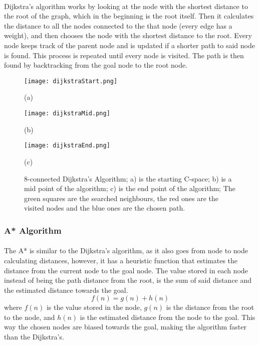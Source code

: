 \paragraph{}Dijkstra’s algorithm works by looking at the node with the shortest distance to the root of the graph, which
in the beginning is the root itself. Then it calculates the distance to all the nodes connected to the that node (every edge
 has a weight), and then chooses the node with the shortest distance to the root. Every node keeps track of the 
parent node and is updated if a shorter path to said node is found. This process is repeated until
every node is visited. The path is then found by backtracking from the goal node to the root node. 
\begin{figure}[htbp]
    \centering
    \begin{minipage}[b]{0.3\textwidth}
        \centering
        \texttt{[image: dijkstraStart.png]} %
        \caption*{(a)}
    \end{minipage}
    \begin{minipage}[b]{0.3\textwidth}
        \centering
        \texttt{[image: dijkstraMid.png]} %
        \caption*{(b)}
    \end{minipage}
    \begin{minipage}[b]{0.3\textwidth}
        \centering
        \texttt{[image: dijkstraEnd.png]} %
        \caption*{(c)}
    \end{minipage}
    \caption{8-connected Dijkstra's Algorithm; a) is the starting C-space; b) is a mid point of the algorithm; c) is the end point of the algorithm; The green squares are the searched neighbours, the red ones are the visited nodes and the blue ones are the chosen path.}
    \label{fig:Dijkstra}
\end{figure}
\subsubsection{A* Algorithm}
\label{subsubsec:A*}
\paragraph{}The A* is similar to the Dijkstra's algorithm, as it also goes from node to node calculating distances, however, 
it has a heuristic function that estimates the distance from the current node to the goal node. The value stored in each node 
instead of being the path distance from the root, is the sum of said distance and the estimated distance towards the goal.
\begin{equation}
    f(n) = g(n) + h(n)
\end{equation}
where $f(n)$ is the value stored in the node, $g(n)$ is the distance from the root to the node, and $h(n)$ is the estimated 
distance from the node to the goal. This way the chosen nodes are biased towards the goal, making the algorithm faster than 
the Dijkstra's.

